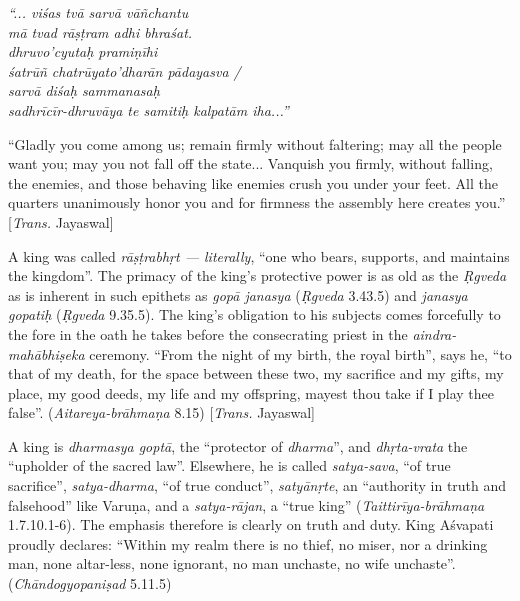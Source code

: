 \smallskip
\begin{myquote}
{{\sl “... viśas tvā sarvā vāñchantu}}\\
{{\sl mā tvad rāṣṭram adhi bhraśat.}}\\
{{\sl dhruvo’cyutaḥ pramiṇīhi}}\\
{{\sl śatrūñ chatrūyato’dharān pādayasva /}}\\
{{\sl sarvā diśaḥ sammanasaḥ}}\\
{{\sl sadhrīcīr-dhruvāya te samitiḥ kalpatām iha...”}}
\end{myquote}
\smallskip

“Gladly you come among us; remain firmly without faltering; may all the people want you; may you not fall off the state... Vanquish you firmly, without falling, the enemies, and those behaving like enemies crush you under your feet. All the quarters unanimously honor you and for firmness the assembly here creates you.” [{\sl Trans.} Jayaswal]

A king was called {\sl rāṣṭrabhṛt --- literally}, “one who bears, supports, and maintains the kingdom”.  The primacy of the king’s protective power is as old as the {\sl Ṛgveda} as is inherent in such epithets as {\sl gopā janasya} ({\sl Ṛgveda} 3.43.5) and {\sl janasya gopatiḥ} ({\sl Ṛgveda} 9.35.5). The king’s obligation to his subjects comes forcefully to the fore in the oath he takes before the consecrating priest in the {\sl aindra-mahābhiṣeka} ceremony. “From the night of my birth, the royal birth”, says he, “to that of my death, for the space between these two, my sacrifice and my gifts, my place, my good deeds, my life and my offspring, mayest thou take if I play thee false”. ({\sl Aitareya-brāhmaṇa} 8.15) [{\sl Trans.} Jayaswal]

A king is {\sl dharmasya goptā}, the “protector of {\sl dharma}”, and {\sl dhṛta-vrata} the “upholder of the sacred law”. Elsewhere, he is called {\sl satya-sava}, “of true sacrifice”, {\sl satya-dharma}, “of true conduct”, {\sl satyānṛte}, an “authority in truth and falsehood” like Varuṇa, and a {\sl satya-rājan}, a “true king” ({\sl Taittirīya-brāhmaṇa} 1.7.10.1-6). The emphasis therefore is clearly on truth and duty. King Aśvapati proudly declares: “Within my realm there is no thief, no miser, nor a drinking man, none altar-less, none ignorant, no man unchaste, no wife unchaste”. ({\sl Chāndogyopaniṣad} 5.11.5) 

